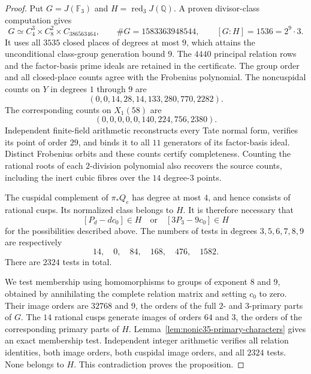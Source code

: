 \begin{proof}
Put $G=J(\mathbb F_3)$ and $H=\operatorname{red}_3J(\mathbb Q)$.
A proven divisor-class computation gives
\[
 G\simeq C_4^3\times C_8^2\times C_{386563464},\qquad
 \#G=1583363948544,\qquad [G:H]=1536=2^9\cdot3.
\]
It uses all $3535$ closed places of degrees at most $9$, which
attains the unconditional class-group generation bound $9$.
The $4440$ principal relation rows and the factor-basis prime
ideals are retained in the certificate. The group order and
all closed-place counts agree with the Frobenius polynomial.
The noncuspidal counts on $Y$ in degrees $1$ through $9$ are
\[
 (0,0,14,28,14,133,280,770,2282).
\]
The corresponding counts on $X_1(58)$ are
\[
 (0,0,0,0,0,140,224,756,2380).
\]
Independent finite-field arithmetic reconstructs every Tate
normal form, verifies its point of order $29$, and binds it to
all $11$ generators of its factor-basis ideal. Distinct
Frobenius orbits and these counts certify completeness.
Counting the rational roots of each $2$-division polynomial
also recovers the source counts, including the inert cubic
fibres over the $14$ degree-$3$ points.

The cuspidal complement of $\pi_*Q_e$ has degree at most $4$,
and hence consists of rational cusps. Its normalized class
belongs to $H$. It is therefore necessary that
\[
 [P_d-dc_0]\in H\quad\text{or}\quad [3P_3-9c_0]\in H
\]
for the possibilities described above.
The numbers of tests in degrees $3,5,6,7,8,9$ are respectively
\[
 14,\quad0,\quad84,\quad168,\quad476,\quad1582.
\]
There are $2324$ tests in total.

We test membership using homomorphisms to groups of exponent
$8$ and $9$, obtained by annihilating the complete relation
matrix and setting $c_0$ to zero. Their image orders are
$32768$ and $9$, the orders of the full $2$- and $3$-primary
parts of $G$. The $14$ rational cusps generate images of orders
$64$ and $3$, the orders of the corresponding primary parts
of $H$. Lemma~\ref{lem:nonic35-primary-characters} gives an exact
membership test. Independent integer arithmetic verifies all
relation identities, both image orders, both cuspidal image
orders, and all $2324$ tests. None belongs to $H$.
This contradiction proves the proposition.
\end{proof}
